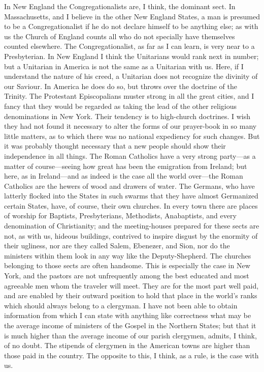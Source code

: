 In New England the Congregationalists are, I think, the dominant
sect.  In Massachusetts, and I believe in the other New England
States, a man is presumed to be a Congregationalist if he do not
declare himself to be anything else; as with us the Church of
England counts all who do not specially have themselves counted
elsewhere.  The Congregationalist, as far as I can learn, is very
near to a Presbyterian.  In New England I think the Unitarians
would rank next in number; but a Unitarian in America is not the
same as a Unitarian with us.  Here, if I understand the nature of
his creed, a Unitarian does not recognize the divinity of our
Saviour.  In America he does do so, but throws over the doctrine of
the Trinity.  The Protestant Episcopalians muster strong in all the
great cities, and I fancy that they would be regarded as taking the
lead of the other religious denominations in New York.  Their
tendency is to high-church doctrines.  I wish they had not found it
necessary to alter the forms of our prayer-book in so many little
matters, as to which there was no national expediency for such
changes.  But it was probably thought necessary that a new people
should show their independence in all things.  The Roman Catholics
have a very strong party---as a matter of course---seeing how great
has been the emigration from Ireland; but here, as in Ireland---and
as indeed is the case all the world over---the Roman Catholics are
the hewers of wood and drawers of water.  The Germans, who have
latterly flocked into the States in such swarms that they have
almost Germanized certain States, have, of course, their own
churches.  In every town there are places of worship for Baptists,
Presbyterians, Methodists, Anabaptists, and every denomination of
Christianity; and the meeting-houses prepared for these sects are
not, as with us, hideous buildings, contrived to inspire disgust by
the enormity of their ugliness, nor are they called Salem,
Ebenezer, and Sion, nor do the ministers within them look in any
way like the Deputy-Shepherd.  The churches belonging to those
sects are often handsome.  This is especially the case in New York,
and the pastors are not unfrequently among the best educated and
most agreeable men whom the traveler will meet.  They are for the
most part well paid, and are enabled by their outward position to
hold that place in the world's ranks which should always belong to
a clergyman.  I have not been able to obtain information from which
I can state with anything like correctness what may be the average
income of ministers of the Gospel in the Northern States; but that
it is much higher than the average income of our parish clergymen,
admits, I think, of no doubt.  The stipends of clergymen in the
American towns are higher than those paid in the country.  The
opposite to this, I think, as a rule, is the case with us.

